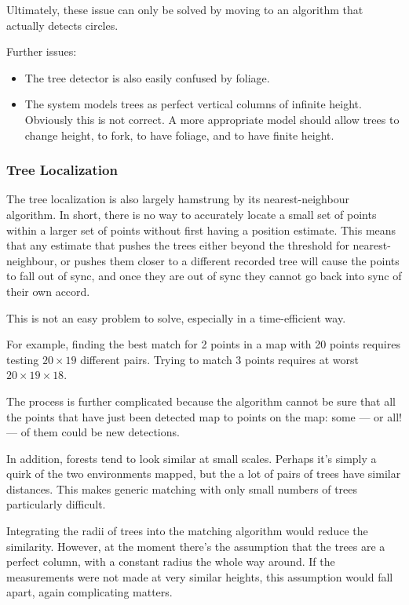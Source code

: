 \documentclass[12pt,oneside,a4paper]{book}
\begin{document}
Ultimately, these issue can only be solved by moving to an algorithm
that actually detects circles.

Further issues:
\begin{itemize}
\item The tree detector is also easily confused by foliage.
\item The system models trees as perfect vertical columns of infinite
  height. Obviously this is not correct. A more appropriate model
  should allow trees to change height, to fork, to have foliage, and
  to have finite height.
\end{itemize}

\subsubsection{Tree Localization}
\label{sec:tree-localization}

The tree localization is also largely hamstrung by its
nearest-neighbour algorithm. In short, there is no way to accurately
locate a small set of points within a larger set of points without
first having a position estimate. This means that any estimate that
pushes the trees either beyond the threshold for nearest-neighbour, or
pushes them closer to a different recorded tree will cause the points
to fall out of sync, and once they are out of sync they cannot go back
into sync of their own accord.

This is not an easy problem to solve, especially in a time-efficient
way. 

For example, finding the best match for 2 points in a map with 20
points requires testing $20 \times 19$ different pairs. Trying to
match 3 points requires at worst $20 \times 19 \times 18$. 

The process is further complicated because the algorithm cannot be
sure that all the points that have just been detected map to points on
the map: some --- or all! --- of them could be new detections.

In addition, forests tend to look similar at small scales. Perhaps
it's simply a quirk of the two environments mapped, but the a lot of
pairs of trees have similar distances. This makes generic matching
with only small numbers of trees particularly difficult.

Integrating the radii of trees into the matching algorithm would
reduce the similarity. However, at the moment there's the assumption
that the trees are a perfect column, with a constant radius the whole
way around. If the measurements were not made at very similar heights,
this assumption would fall apart, again complicating matters.
\end{document}
